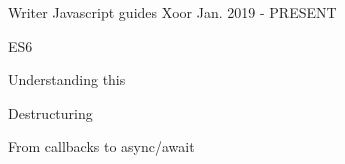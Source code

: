 


\begin{cventries}




\cventry
{Writer} %
{Javascript guides} %
{Xoor} %
{Jan. 2019 - PRESENT} %
{ %
\begin{cvitems}
\item {ES6}
\item {Understanding this}
\item {Destructuring}
\item {From callbacks to async/await}
\end{cvitems}
}

\end{cventries}
